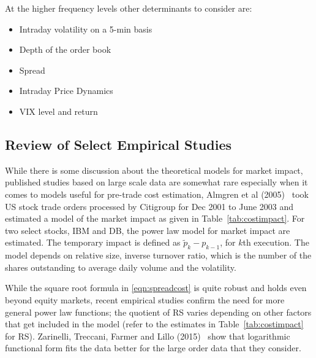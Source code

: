 At the higher frequency levels other determinants to consider are:
	\begin{itemize}
	\item Intraday volatility on a 5-min basis
	\item Depth of the order book
	\item Spread
	\item Intraday Price Dynamics
	\item VIX level and return \twomedskip
	\end{itemize}



\subsection{Review of Select Empirical Studies}

While there is some discussion about the theoretical models for market impact, published studies based on large scale data are somewhat rare especially when it comes to models useful for pre-trade cost estimation, Almgren et al (2005)~\cite{athl} took US stock trade orders processed by Citigroup for Dec 2001 to June 2003 and estimated a model of the market impact as given in Table~\ref{tab:costimpact}. For two select stocks, IBM and DB, the power law model for market impact are estimated. The temporary impact is defined as $\widetilde{p}_k - p_{k-1}$, for $k$th execution. The model depends on relative size, inverse turnover ratio, which is the number of the shares outstanding to average daily volume and the volatility.


While the square root formula in \eqref{eqn:spreadcost} is quite robust and holds even beyond equity markets, recent empirical studies confirm the need for more general power law functions; the quotient of RS varies depending on other factors that get included in the model (refer to the estimates in Table~\ref{tab:costimpact} for RS). Zarinelli, Treccani, Farmer and Lillo (2015)~\cite{zar} show that logarithmic functional form fits the data better for the large order data that they consider. 



